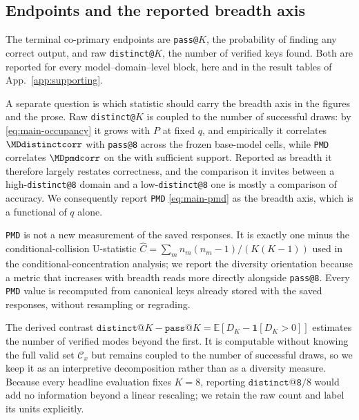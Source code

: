 \documentclass{article}
\newcommand{\1}{\mathbf 1}
\newcommand{\E}{\mathbb E}
\newcommand{\pmd}{\texttt{PMD}}
\theoremstyle{remark}
\theoremstyle{definition}
\theoremstyle{plain}
\begin{document}
\subsection{Endpoints and the reported breadth axis}
\label{app:registered-endpoints}

The terminal co-primary endpoints are \texttt{pass@}$K$, the probability of
finding any correct output, and raw \texttt{distinct@}$K$, the number of
verified keys found. Both are reported for every model--domain--level block,
here and in the result tables of App.~\ref{app:supporting}.

A separate question is which statistic should carry the breadth axis in the
figures and the prose. Raw \texttt{distinct@}$K$ is coupled to the number of successful
draws: by \eqref{eq:main-occupancy} it grows with $P$ at fixed $q$, and
empirically it correlates $\MDdistinctcorr$ with \texttt{pass@8} across the
\MDcells{} frozen base-model cells, while \pmd{} correlates $\MDpmdcorr$ on the
\MDreportable{} with sufficient support.
Reported as breadth it therefore largely restates correctness, and the
comparison it invites between a high-\texttt{distinct@8} domain and a
low-\texttt{distinct@8} one is mostly a comparison of accuracy. We consequently
report \pmd{} \eqref{eq:main-pmd} as the breadth axis, which is a functional of
$q$ alone.

\pmd{} is not a new measurement of the saved responses. It is exactly one minus
the conditional-collision U-statistic
$\widehat C=\sum_m n_m(n_m-1)/(K(K-1))$ used in the conditional-concentration
analysis; we report the diversity orientation because a metric that increases
with breadth reads more directly alongside \texttt{pass@8}. Every \pmd{} value
is recomputed from canonical keys already stored with the saved responses,
without resampling or regrading.

The derived contrast $\texttt{distinct@}K-\texttt{pass@}K=\E[D_K-\1[D_K>0]]$
estimates the number of verified modes beyond the first. It is computable
without knowing the full valid set $\mathcal C_x$ but remains coupled to the
number of successful draws, so we keep it as an interpretive decomposition
rather than as a diversity measure. Because every
headline evaluation fixes $K=8$, reporting $\texttt{distinct@8}/8$ would add no
information beyond a linear rescaling; we retain the raw count and label its
units explicitly.
\end{document}
